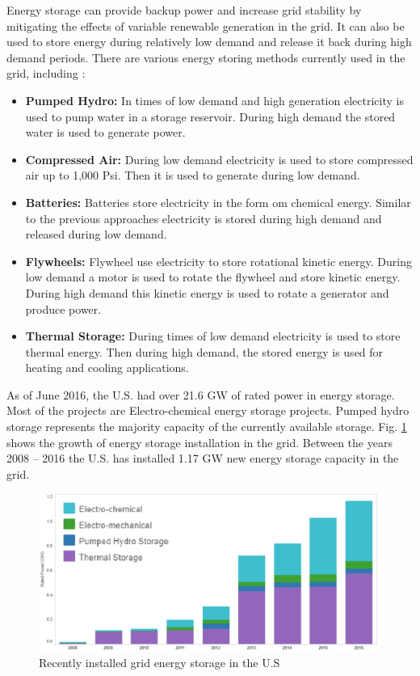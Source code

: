 Energy storage can provide backup power and increase grid stability by mitigating the effects of variable renewable generation in the grid. It can also be used to store energy during relatively low demand and release it back during high demand periods. There are various energy storing methods currently used in the grid, including \cite{GE1}:
\begin{itemize}
    \item \textbf{Pumped Hydro:} In times of low demand and high generation electricity is used to pump water in a storage reservoir. During high demand the stored water is used to generate power.
    \item \textbf{Compressed Air:} During low demand electricity is used to store compressed air up to 1,000 Psi. Then it is used to generate during low demand.
    \item \textbf{Batteries:} Batteries store electricity in the form om chemical energy. Similar to the previous approaches electricity is stored during high demand and released during low demand.
    \item \textbf{Flywheels:} Flywheel use electricity to store rotational kinetic energy. During low demand a motor is used to rotate the flywheel and store kinetic energy. During high demand this kinetic energy is used to rotate a generator and produce power.
    \item \textbf{Thermal Storage:} During times of low demand electricity is used to store thermal energy. Then during high demand, the stored energy is used for heating and cooling applications.
\end{itemize}

As of June 2016, the U.S. had over 21.6 GW of rated power in energy storage. Most of the projects are Electro-chemical energy storage projects. Pumped hydro storage represents the majority capacity of the currently available storage. Fig. \ref{fig:ES_INCREASE} shows the growth of energy storage installation in the grid. Between the years 2008 – 2016 the U.S. has installed 1.17 GW new energy storage capacity in the grid. 

\begin{figure}[!h]
\centering
\includegraphics[width=0.85\linewidth]{figs/ES_INCREASE.png}
\caption[Recently installed grid energy storage in the U.S.]{Recently installed grid energy storage in the U.S \cite{GE2}}
\label{fig:ES_INCREASE}
\end{figure}


